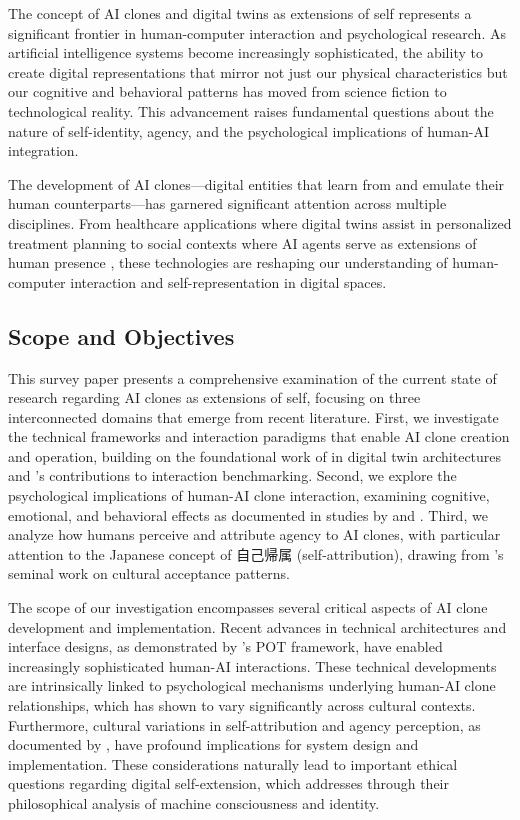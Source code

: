 The concept of AI clones and digital twins as extensions of self represents a significant frontier in human-computer interaction and psychological research. As artificial intelligence systems become increasingly sophisticated, the ability to create digital representations that mirror not just our physical characteristics but our cognitive and behavioral patterns has moved from science fiction to technological reality. This advancement raises fundamental questions about the nature of self-identity, agency, and the psychological implications of human-AI integration.

The development of AI clones---digital entities that learn from and emulate their human counterparts---has garnered significant attention across multiple disciplines. From healthcare applications where digital twins assist in personalized treatment planning \citep{kim2024healthcare} to social contexts where AI agents serve as extensions of human presence \citep{kawakami2020digital}, these technologies are reshaping our understanding of human-computer interaction and self-representation in digital spaces.

\subsection{Scope and Objectives}

This survey paper presents a comprehensive examination of the current state of research regarding AI clones as extensions of self, focusing on three interconnected domains that emerge from recent literature. First, we investigate the technical frameworks and interaction paradigms that enable AI clone creation and operation, building on the foundational work of \citet{smith2022digital} in digital twin architectures and \citet{wang2024simbench}'s contributions to interaction benchmarking. Second, we explore the psychological implications of human-AI clone interaction, examining cognitive, emotional, and behavioral effects as documented in studies by \citet{maeda2023self} and \citet{yamamoto2024personality}. Third, we analyze how humans perceive and attribute agency to AI clones, with particular attention to the Japanese concept of 自己帰属 (self-attribution), drawing from \citet{nakagawa2019cultural}'s seminal work on cultural acceptance patterns.

The scope of our investigation encompasses several critical aspects of AI clone development and implementation. Recent advances in technical architectures and interface designs, as demonstrated by \citet{mandischer2024pot}'s POT framework, have enabled increasingly sophisticated human-AI interactions. These technical developments are intrinsically linked to psychological mechanisms underlying human-AI clone relationships, which \citet{niwa2024facial} has shown to vary significantly across cultural contexts. Furthermore, cultural variations in self-attribution and agency perception, as documented by \citet{dejuan2024western}, have profound implications for system design and implementation. These considerations naturally lead to important ethical questions regarding digital self-extension, which \citet{namestiuk2023self} addresses through their philosophical analysis of machine consciousness and identity.

